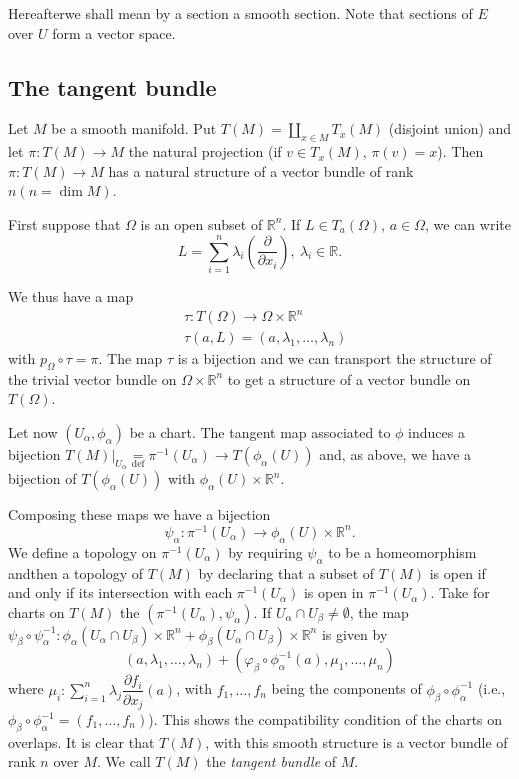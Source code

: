 Hereafter\pageoriginale we shall mean by a section a smooth section. Note that sections of $E$ over $U$ form a vector space.

\subsection*{The tangent bundle}

Let $M$ be a smooth manifold. Put $T(M)=\coprod\limits_{x\in M}T_{x}(M)$ (disjoint union) and let $\pi:T(M)\to M$ the natural projection (if $v\in T_{x}(M)$, $\pi(v)=x$). Then $\pi:T(M)\to M$ has a natural structure of a vector bundle of rank $n(n=\dim M)$.

First suppose that $\Omega$ is an open subset of $\mathbb{R}^{n}$. If $L\in T_{a}(\Omega)$, $a\in \Omega$, we can write
$$
L=\sum\limits^{n}_{i=1}\lambda_{i}\left(\dfrac{\partial}{\partial x_{i}}\right), \ \lambda_{i}\in \mathbb{R}.
$$

\eject

We thus have a map
\begin{align*}
& \tau : T(\Omega)\to \Omega\times \mathbb{R}^{n}\\[3pt]
& \tau(a,L)=(a,\lambda_{1},\ldots,\lambda_{n})
\end{align*}
with $p_{\Omega}\circ \tau =\pi$. The map $\tau$ is a bijection and we can transport the structure of the trivial vector bundle on $\Omega\times \mathbb{R}^{n}$ to get a structure of a vector bundle on $T(\Omega)$.

Let now $(U_{\alpha},\phi_{\alpha})$ be a chart. The tangent map associated to $\phi$ induces a bijection $T(M)|_{U_{\alpha}}{\displaystyle{\mathop{=}\limits_{\text{def}}}}\pi^{-1}(U_{\alpha})\to T(\phi_{\alpha}(U))$ and, as above, we have a bijection of $T(\phi_{\alpha}(U))$ with $\phi_{\alpha}(U)\times \mathbb{R}^{n}$.

Composing these maps we have a bijection
$$
\psi_{\alpha} : \pi^{-1}(U_{\alpha})\to \phi_{\alpha}(U)\times \mathbb{R}^{n}.
$$
We define a topology on $\pi^{-1}(U_{\alpha})$ by requiring $\psi_{\alpha}$ to be a homeomorphism and\pageoriginale then a topology of $T(M)$ by declaring that a subset of $T(M)$ is open if and only if its intersection with each $\pi^{-1}(U_{\alpha})$ is open in $\pi^{-1}(U_{\alpha})$. Take for charts on $T(M)$ the $(\pi^{-1}(U_{\alpha}),\psi_{\alpha})$. If $U_{\alpha}\cap U_{\beta}\neq \emptyset$, the map $\psi_{\beta}\circ \psi^{-1}_{\alpha}:\phi_{\alpha}(U_{\alpha}\cap U_{\beta})\times \mathbb{R}^{n}+\phi_{\beta}(U_{\alpha}\cap U_{\beta})\times \mathbb{R}^{n}$ is given by 
$$
(a,\lambda_{1},\ldots,\lambda_{n})+(\varphi_{\beta}\circ \phi^{-1}_{\alpha}(a),\mu_{1},\ldots,\mu_{n})
$$
where $\mu_{i}:\sum\limits^{n}_{i=1}\lambda_{j}\dfrac{\partial f_{i}}{\partial x_{j}}(a)$, with $f_{1},\ldots,f_{n}$ being the components of $\phi_{\beta}\circ \phi^{-1}_{\alpha}$ (i.e., $\phi_{\beta}\circ \phi^{-1}_{\alpha}=(f_{1},\ldots,f_{n})$). This shows the compatibility condition of the charts on overlaps. It is clear that $T(M)$, with this smooth structure is a vector bundle of rank $n$ over $M$. We call $T(M)$ the {\em tangent bundle} of $M$.

